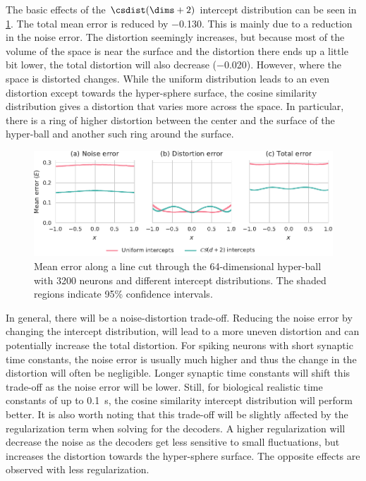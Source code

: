 The basic effects of the $\csdist(\dims + 2)$ intercept distribution can be seen in \cref{fig:error-cs-intercepts}.
The total mean error is reduced by \num{-0.130}.
This is mainly due to a reduction in the noise error.
The distortion seemingly increases, but because most of the volume of the space is near the surface and the distortion there ends up a little bit lower, the total distortion will also decrease (\num{-0.020}).
However, where the space is distorted changes.
While the uniform distribution leads to an even distortion except towards the hyper-sphere surface, the cosine similarity distribution gives a distortion that varies more across the space.
In particular, there is a ring of higher distortion between the center and the surface of the hyper-ball and another such ring around the surface.
\begin{figure}
    \centering
    \includegraphics{figures/error-cs-intercepts}
    \caption{Mean error along a line cut through the 64-dimensional hyper-ball with 3200 neurons and different intercept distributions. The shaded regions indicate 95\% confidence intervals.}\label{fig:error-cs-intercepts}
\end{figure}

In general, there will be a noise-distortion trade-off.
Reducing the noise error by changing the intercept distribution, will lead to a more uneven distortion and can potentially increase the total distortion.
For spiking neurons with short synaptic time constants, the noise error is usually much higher and thus the change in the distortion will often be negligible.
Longer synaptic time constants will shift this trade-off as the noise error will be lower.
Still, for biological realistic time constants of up to \SI{0.1}{\second}, the cosine similarity intercept distribution will perform better.
It is also worth noting that this trade-off will be slightly affected by the regularization term when solving for the decoders.
A higher regularization will decrease the noise as the decoders get less sensitive to small fluctuations, but increases the distortion towards the hyper-sphere surface.
The opposite effects are observed with less regularization.

